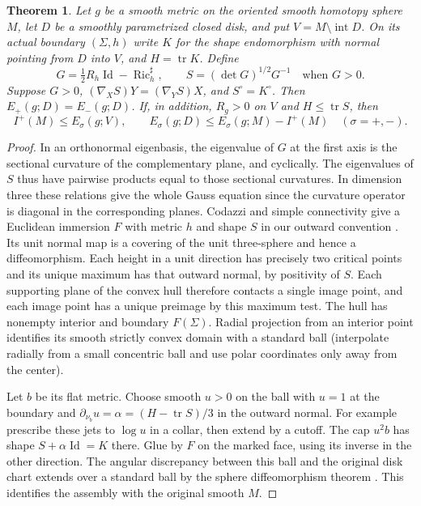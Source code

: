 \documentclass[11pt,letterpaper]{article}
\numberwithin{equation}{section}
\newtheorem{theorem}{Theorem}[section]
\DeclareMathOperator{\Ric}{Ric}
\DeclareMathOperator{\tr}{tr}
\begin{document}
\begin{theorem}\label{thm:convex}
Let \(g\) be a smooth metric on the oriented smooth homotopy sphere
\(M\), let \(D\) be a smoothly parametrized closed disk, and put
\(V=M\setminus\operatorname{int}D\).
On its actual boundary \((\Sigma,h)\) write \(K\) for the shape
endomorphism with normal pointing from \(D\) into \(V\), and
\(H=\tr K\). Define
\[
 G=\tfrac12 R_h\operatorname{Id}-\Ric_h^\sharp,\qquad
 S=(\det G)^{1/2}G^{-1}\quad\text{when }G>0 .
\]
Suppose \(G>0\), \((\nabla_X S)Y=(\nabla_Y S)X\), and
\(S^\circ=K^\circ\). Then
\(E_+(g;D)=E_-(g;D)\). If, in addition, \(R_g>0\) on \(V\)
and \(H\le\tr S\), then
\[
 I^+(M)\le E_\sigma(g;V),\qquad
 E_\sigma(g;D)\le E_\sigma(g;M)-I^+(M)
 \quad(\sigma=+,-).
\]
\end{theorem}
\begin{proof}
In an orthonormal eigenbasis, the eigenvalue of \(G\) at the first
axis is the sectional curvature of the complementary plane, and
cyclically. The eigenvalues of \(S\) thus have pairwise products
equal to those sectional curvatures. In dimension three these relations
give the whole Gauss equation since the curvature operator is diagonal
in the corresponding planes. Codazzi and simple connectivity give
a Euclidean immersion \(F\) with metric \(h\) and shape \(S\)
in our outward convention \cite[Theorem 1.3]{LiSimonZhaoHu2015}.
Its unit normal map is a covering of the unit three-sphere and hence
a diffeomorphism. Each height in a unit direction has precisely two
critical points and its unique maximum has that outward normal, by
positivity of \(S\). Each supporting plane of the convex hull
therefore contacts a single image point, and each image point has
a unique preimage by this maximum test. The hull has nonempty
interior and boundary \(F(\Sigma)\). Radial projection from an
interior point identifies its smooth strictly convex domain with a
standard ball (interpolate radially from a small concentric ball
and use polar coordinates only away from the center).

Let \(b\) be its flat metric. Choose smooth \(u>0\) on the ball
with \(u=1\) at the boundary and
\(\partial_{\nu_b}u=\alpha=(H-\tr S)/3\) in the outward normal.
For example prescribe these jets to \(\log u\) in a collar, then
extend by a cutoff. The cap \(u^2b\) has shape \(S+\alpha
\operatorname{Id}=K\) there. Glue by \(F\) on the marked face,
using its inverse in the other direction. The angular discrepancy
between this ball and the original disk chart extends over a
standard ball by the sphere diffeomorphism theorem
\cite{Hatcher1983Smale}. This identifies the assembly with the
original smooth \(M\).


\end{proof}
\end{document}
